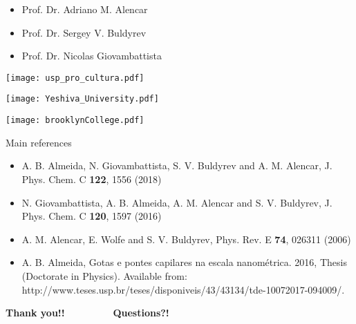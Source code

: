 \documentclass[8pt]{beamer}
\begin{document}
\begin{frame}
    \begin{minipage}{0.44\textwidth}
       \begin{itemize}
	    	\item Prof. Dr. Adriano M. Alencar
			\item Prof. Dr. Sergey V. Buldyrev
			\item Prof. Dr. Nicolas Giovambattista				
	   \end{itemize}							
    \end{minipage}
	\begin{minipage}{0.175\textwidth}
			\begin{center}
		   	 	\texttt{[image: usp\_pro\_cultura.pdf]}
    		\end{center}		   	 	
	\end{minipage}
	\begin{minipage}{0.175\textwidth}	
			\begin{center}
				\texttt{[image: Yeshiva\_University.pdf]}
    		\end{center}				
	\end{minipage}
	\begin{minipage}{0.175\textwidth}	
			\begin{center}
				\texttt{[image: brooklynCollege.pdf]}
    		\end{center}				
	\end{minipage}
	\vspace{-0.1cm}
	\begin{block}{Main references}
		\begin{itemize}
			\item \footnotesize{A. B. Almeida, N. Giovambattista, S. V. Buldyrev and A. M. Alencar, J. Phys. Chem. C \textbf{122}, 1556 (2018)}
			\item \footnotesize{N. Giovambattista, A. B. Almeida, A. M. Alencar and S. V. Buldyrev, J. Phys. Chem. C \textbf{120}, 1597 (2016)}
		    \item \footnotesize{A. M. Alencar, E. Wolfe and S. V. Buldyrev, Phys. Rev. E \textbf{74}, 026311 (2006)}						
			\item \footnotesize A. B. Almeida, Gotas e pontes capilares na escala nanométrica. 2016, Thesis (Doctorate in Physics). Available from: http://www.teses.usp.br/teses/disponiveis/43/43134/tde-10072017-094009/.
		\end{itemize}
	\end{block}
	\begin{center}
	    \pause
		\textbf{\LARGE Thank you!!~~~~~~~~ Questions?!}
	\end{center}
\end{frame}
\end{document}
